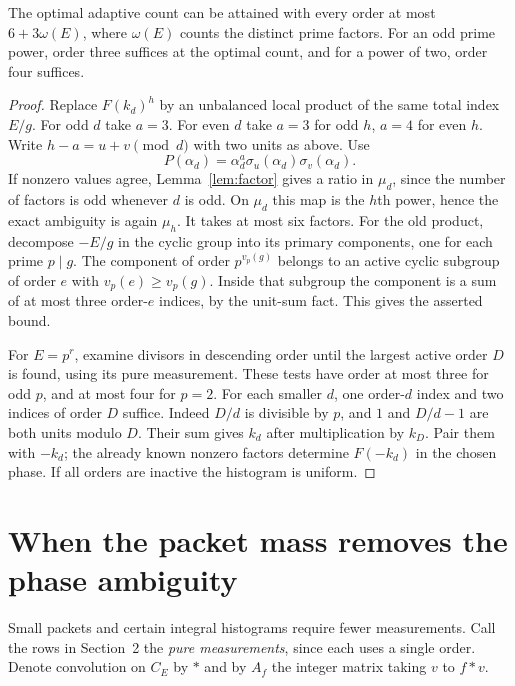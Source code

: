 \documentclass[11pt,letterpaper]{article}
\begin{document}
\begin{proposition}\label{prop:adapt}
The optimal adaptive count can be attained with every order at most $6+3\omega(E)$, where $\omega(E)$ counts the distinct prime factors. For an odd prime power, order three suffices at the optimal count, and for a power of two, order four suffices.
\end{proposition}
\begin{proof}
Replace $F(k_d)^h$ by an unbalanced local product of the same total index $E/g$. For odd $d$ take $a=3$. For even $d$ take $a=3$ for odd $h$, $a=4$ for even $h$. Write $h-a=u+v\pmod d$ with two units as above. Use
\[
                  P(\alpha_d)=\alpha_d^a\sigma_u(\alpha_d)\sigma_v(\alpha_d).
\]
If nonzero values agree, Lemma~\ref{lem:factor} gives a ratio in $\mu_d$, since the number of factors is odd whenever $d$ is odd. On $\mu_d$ this map is the $h$th power, hence the exact ambiguity is again $\mu_h$. It takes at most six factors. For the old product, decompose $-E/g$ in the cyclic group into its primary components, one for each prime $p\mid g$. The component of order $p^{v_p(g)}$ belongs to an active cyclic subgroup of order $e$ with $v_p(e)\ge v_p(g)$. Inside that subgroup the component is a sum of at most three order-$e$ indices, by the unit-sum fact. This gives the asserted bound.

For $E=p^r$, examine divisors in descending order until the largest active order $D$ is found, using its pure measurement. These tests have order at most three for odd $p$, and at most four for $p=2$. For each smaller $d$, one order-$d$ index and two indices of order $D$ suffice. Indeed $D/d$ is divisible by $p$, and $1$ and $D/d-1$ are both units modulo $D$. Their sum gives $k_d$ after multiplication by $k_D$. Pair them with $-k_d$; the already known nonzero factors determine $F(-k_d)$ in the chosen phase. If all orders are inactive the histogram is uniform.
\end{proof}

\newpage
\section{When the packet mass removes the phase ambiguity}
Small packets and certain integral histograms require fewer measurements. Call the rows in Section~2 the \emph{pure measurements}, since each uses a single order. Denote convolution on $C_E$ by $*$ and by $A_f$ the integer matrix taking $v$ to $f*v$.
\end{document}
